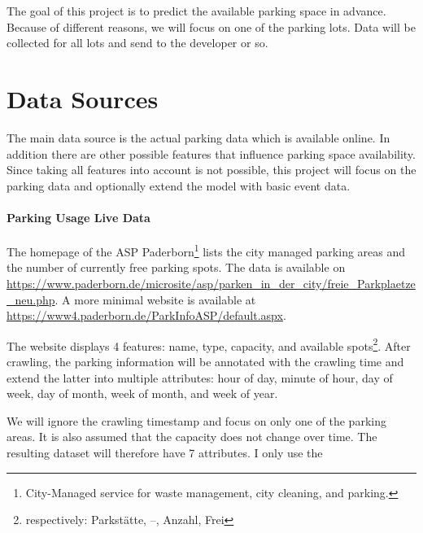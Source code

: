\documentclass[journal,10pt]{IEEEtran}
\begin{document}
The goal of this project is to predict the available parking space in advance. Because of different reasons, we will focus on one of the parking lots. Data will be collected for all lots and send to the developer or so.


\section{Data Sources}\label{data sources}
The main data source is the actual parking data which is available online. In addition there are other possible features that influence parking space availability. Since taking all features into account is not possible, this project will focus on the parking data and optionally extend the model with basic event data.

\paragraph{Parking Usage Live Data}
The homepage of the ASP Paderborn\footnote{City-Managed service for waste management, city cleaning, and parking.} lists the city managed parking areas and the number of currently free parking spots. 
The data is available on \url{https://www.paderborn.de/microsite/asp/parken_in_der_city/freie_Parkplaetze_neu.php}. A more minimal website is available at \url{https://www4.paderborn.de/ParkInfoASP/default.aspx}. 

The website displays 4 features: name, type, capacity, and available spots\footnote{respectively: Parkstätte, --, Anzahl, Frei}. After crawling, the parking information will be annotated with the crawling time and extend the latter into multiple attributes: hour of day, minute of hour, day of week, day of month, week of month, and week of year.

We will ignore the crawling timestamp and focus on only one of the parking areas. It is also assumed that the capacity does not change over time. The resulting dataset will therefore have 7 attributes. I only use the 

\end{document}
